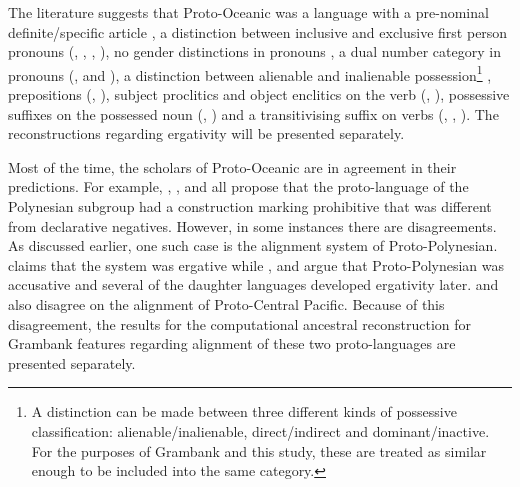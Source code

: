\documentclass[a4paper,10pt]{article} %
\begin{document}

The literature suggests that Proto-Oceanic was a language with a pre-nominal definite/specific article \citep[136]{crowley1985common}, a distinction between inclusive and exclusive first person pronouns (\citet[112]{pawley1973some}, \citet[184]{crowley1985common}, \citet[500]{ross2004morphosyntactic}, \citet[67, 75]{lynchrosscrowley_proto_grammar_oceanic}), no gender distinctions in pronouns \citep[498]{ross2004morphosyntactic}, a dual number category in pronouns (\citet[498]{ross2004morphosyntactic}, \citet[69]{lynchrosscrowley_proto_grammar_oceanic} and \citet[173]{pawley1973some}), a distinction between alienable and inalienable possession\footnote{A distinction can be made between three different kinds of possessive classification: alienable/inalienable, direct/indirect and dominant/inactive. For the purposes of Grambank and this study, these are treated as similar enough to be included into the same category.} \citep[69]{lynchrosscrowley_proto_grammar_oceanic}, prepositions (\citet[167]{pawley1973some}, \citet[498]{ross2004morphosyntactic}), subject proclitics and object enclitics on the verb (\citet[498-499]{ross2004morphosyntactic}, \citet[83]{lynchrosscrowley_proto_grammar_oceanic}), possessive suffixes on the possessed noun (\citet[495]{ross2004morphosyntactic}, \citet[155]{pawley1973some}) and a transitivising suffix on verbs (\citet[352]{pawley1970change}, \citet[171]{pawley1973some}, \citet[80, 92]{lynchrosscrowley_proto_grammar_oceanic}). The reconstructions regarding ergativity will be presented separately.

Most of the time, the scholars of Proto-Oceanic are in agreement in their predictions. For example, \citet[142]{pawley1973some}, \citet[292]{ross2007two}, \citet[xiii, 125]{clark1976aspects} and \citet[89]{lynchrosscrowley_proto_grammar_oceanic} all propose that the proto-language of the Polynesian subgroup had a construction marking prohibitive that was different from declarative negatives. However, in some instances there are disagreements. As discussed earlier, one such case is the alignment system of Proto-Polynesian. \citet{clark1976aspects} claims that the system was ergative while \citet{hale_1968}, \citet{hohepa_1967,hohepa_1969} and \citet{chung1978} argue that Proto-Polynesian was accusative and several of the daughter languages developed ergativity later. \citet{kikusawa2002proto} and \citet{ball2007ergativity} also disagree on the alignment of Proto-Central Pacific. Because of this disagreement, the results for the computational ancestral reconstruction for Grambank features regarding alignment of these two proto-languages are presented separately.
\end{document}
